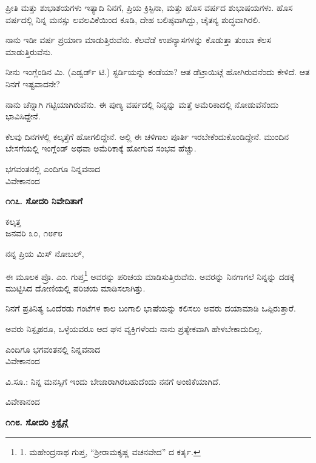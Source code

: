 ಪ್ರೀತಿ ಮತ್ತು ಶುಭಾಶಯಗಳು ಇತ್ಯಾದಿ ನಿನಗೆ, ಪ್ರಿಯ ಕ್ರಿಸ್ಟಿನಾ, ಮತ್ತು ಹೊಸ ವರ್ಷದ ಶುಭಾಷಯಗಳು. ಹೊಸ ವರ್ಷದಲ್ಲಿ ನಿನ್ನ ಮನಸ್ಸು ಲವಲವಿಕೆಯಿಂದ ಕೂಡಿ, ದೇಹ ಬಲಿಷ್ಠವಾಗಿದ್ದು, ಚೈತನ್ಯ ಶುದ್ಧವಾಗಿರಲಿ.

ನಾನು ಇಡೀ ವರ್ಷ ಪ್ರಯಾಣ ಮಾಡುತ್ತಿರುವೆನು. ಕೆಲವೆಡೆ ಉಪನ್ಯಾಸಗಳನ್ನು ಕೊಡುತ್ತಾ ತುಂಬಾ ಕೆಲಸ ಮಾಡುತ್ತಿರುವೆನು.

ನೀನು ಇಂಗ್ಲೆಂಡಿನ ಮಿ. (ಎಡ್ವರ್ಡ್ ಟಿ.) ಸ್ಟರ್ಡಿಯನ್ನು ಕಂಡೆಯಾ? ಆತ ಡೆಟ್ರಾಯಿಟ್ಗೆ ಹೋಗಿರುವನೆಂದು ಕೇಳಿದೆ. ಆತ ನಿನಗೆ ಇಷ್ಟವಾದನೇ?

ನಾನು ಚೆನ್ನಾಗಿ ಗಟ್ಟಿಯಾಗಿರುವೆನು. ಈ ಪುಣ್ಯ ವರ್ಷದಲ್ಲಿ ನಿನ್ನನ್ನು ಮತ್ತೆ ಅಮೆರಿಕಾದಲ್ಲಿ ನೋಡುವೆನೆಂದು ಭಾವಿಸಿದ್ದೇನೆ.

ಕೆಲವು ದಿನಗಳಲ್ಲಿ ಕಲ್ಕತ್ತೆಗೆ ಹೋಗಲಿದ್ದೇನೆ. ಅಲ್ಲಿ ಈ ಚಳಿಗಾಲ ಪೂರ್ತಿ ಇರಬೇಕೆಂದುಕೊಂಡಿದ್ದೇನೆ. ಮುಂದಿನ ಬೇಸಗೆಯಲ್ಲಿ ಇಂಗ್ಲೆಂಡ್ ಅಥವಾ ಅಮೆರಿಕಾಕ್ಕೆ ಹೋಗುವ ಸಂಭವ ಹೆಚ್ಚು.

\begin{flushright}
ಭಗವಂತನಲ್ಲಿ ಎಂದಿಗೂ ನಿನ್ನವನಾದ\\ವಿವೇಕಾನಂದ
\end{flushright}

\begin{center}
\textbf{೧೧೭. ಸೋದರಿ ನಿವೇದಿತಾಗೆ}
\end{center}

\begin{flushright}
ಕಲ್ಕತ್ತ\\ಜನವರಿ ೩೦, ೧೮೯೮
\end{flushright}

ನನ್ನ ಪ್ರಿಯ ಮಿಸ್ ನೋಬಲ್,

ಈ ಮೂಲಕ ಪ್ರೊ. ಎಂ. ಗುಪ್ತ\footnote{1. ಮಹೇಂದ್ರನಾಥ ಗುಪ್ತ, “ಶ‍್ರೀರಾಮಕೃಷ್ಣ ವಚನವೇದ” ದ ಕರ್ತೃ.} ಅವರನ್ನು ಪರಿಚಯ ಮಾಡಿಸುತ್ತಿರುವೆನು. ಅವರನ್ನು ನಿನಗಾಗಲೆ ನಿನ್ನನ್ನು ದಡಕ್ಕೆ ಮುಟ್ಟಿಸಿದ ದೋಣಿಯಲ್ಲಿ ಪರಿಚಯ ಮಾಡಿಸಲಾಗಿತ್ತು.

ನಿನಗೆ ಪ್ರತಿನಿತ್ಯ ಒಂದೆರಡು ಗಂಟೆಗಳ ಕಾಲ ಬಂಗಾಲಿ ಭಾಷೆಯನ್ನು ಕಲಿಸಲು ಅವರು ದಯಾಮಾಡಿ ಒಪ್ಪಿರುತ್ತಾರೆ.

ಅವರು ನಿಸ್ಪೃಹರೂ, ಒಳ್ಳೆಯವರೂ ಆದ ಘನ ವ್ಯಕ್ತಿಗಳೆಂದು ನಾನು ಪ್ರತ್ಯೇಕವಾಗಿ ಹೇಳಬೇಕಾದುದಿಲ್ಲ.

\begin{flushright}
ಎಂದಿಗೂ ಭಗವಂತನಲ್ಲಿ ನಿನ್ನವನಾದ\\ವಿವೇಕಾನಂದ
\end{flushright}

ವಿ.ಸೂ.: ನಿನ್ನ ಮನಸ್ಸಿಗೆ ಇಂದು ಬೇಜಾರಾಗಿರಬಹುದೆಂದು ನನಗೆ ಅಂಜಿಕೆಯಾಗಿದೆ.

\begin{flushright}
ವಿವೇಕಾನಂದ
\end{flushright}

\begin{center}
\textbf{೧೧೮. ಸೋದರಿ ಕ್ರಿಸ್ಟೈನ್ಗೆ}
\end{center}

